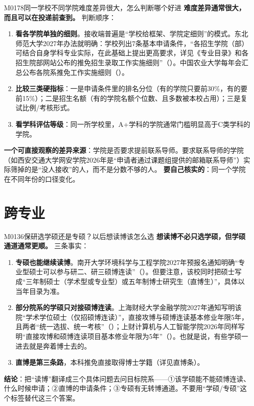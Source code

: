 \begin{qa}{M0178}{同一学校不同学院难度差异很大，怎么判断哪个好进}
\textbf{难度差异通常很大，而且可以在投递前查到。} 判断顺序：
\begin{enumerate}
  \item \textbf{看各学院单独的细则}。接收端普遍是“学校给框架、学院定细则”的模式。东北师范大学2027年办法就明确：学校列出7条基本申请条件，“各招生学院（部）可结合自身学科专业实际，在此基础上提出更高要求，详见《专业目录》和各招生院部网站公布的推免招生录取工作实施细则”（）。中国农业大学每年会汇总公布各院系推免工作实施细则（）。
  \item \textbf{比较三类硬指标}：一是申请条件里的排名分位（有的学院只要前30\%，有的要前15\%）；二是招生名额（有的学院名额个位数、且多数被本校占用）；三是复试比例/考核形式。
  \item \textbf{看学科评估等级}：同一所学校里，A+学科的学院通常门槛明显高于C类学科的学院。
\end{enumerate}
\textbf{一个可直接观察的差异来源}：学院是否要求提前联系导师。要求联系导师的学院（如西安交通大学网安学院2026年是“申请者通过课题组提供的邮箱联系导师”）实际筛掉的是“没人接收”的人，而不是分数不够的人。
\textbf{要自己核实的}：同一个学院在不同年份的口径变化。
\end{qa}

\section{跨专业}
\begin{qa}{M0136}{保研选学硕还是专硕？以后想读博该怎么选}
\textbf{想读博不必只选学硕，但学硕通道通常更顺。} 三条事实：
\begin{enumerate}
  \item \textbf{专硕也能继续读博}。南开大学环境科学与工程学院2027年预报名通知明确“专业型硕士可以参与研二、研三硕博连读”（）。但要注意，该校同时把硕士写成“三年制硕士（学术型或专业型）或五年制博士研究生（直博生）”，具体以当年目录为准。
  \item \textbf{部分院系的学硕只对接硕博连读}。上海财经大学金融学院2027年通知写明该院“学术学位硕士（仅招硕博连读）”，直接攻博与硕博连读基本修业年限5年，且两者“统一选拔、统一考核”（）；上财计算机与人工智能学院2026年同样写明“直接攻博和硕博连读项目基本修业年限为5年”（）。也就是说，有些学硕一进去就是奔着博士去的。
  \item \textbf{直博是第三条路}，本科推免直接取得博士学籍（详见直博条）。
\end{enumerate}
\textbf{结论}：把“读博”翻译成三个具体问题去问目标院系——①该学硕能不能硕博连读、什么时候申请；②直博的申请条件；③专硕有无转博通道。不要用“学硕/专硕”这个标签替代这三个答案。
\end{qa}

